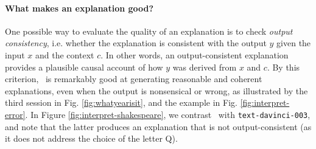 




\paragraph{What makes an explanation good?}
One possible way to evaluate the quality of an explanation is to check \emph{output consistency}, i.e. whether the explanation is consistent with the output $y$ given the input $x$ and the context $c$. In other words, an output-consistent explanation provides a plausible causal account of how $y$ was derived from $x$ and $c$.
By this criterion, \DV\ is remarkably good at generating reasonable and coherent explanations, even when the output is nonsensical or wrong, as illustrated by the third session in Fig. \ref{fig:whatyearisit}, and the example in Fig. \ref{fig:interpret-error}. In Figure \ref{fig:interpret-shakespeare}, we contrast \DV\ with \texttt{text-davinci-003}, and note that the latter produces an explanation that is not output-consistent (as it does not address the choice of the letter Q).

